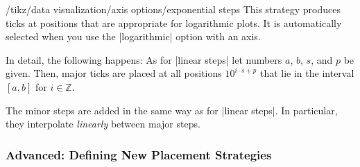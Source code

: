 \label{section-dv-exponential-strategy}

\begin{key}{/tikz/data visualization/axis options/exponential steps}
    This strategy produces ticks at positions that are appropriate for
    logarithmic plots. It is automatically selected when you use the
    |logarithmic| option with an axis.

    In detail, the following happens: As for |linear steps| let numbers $a$,
    $b$, $s$, and $p$ be given. Then, major ticks are placed at all positions
    $10^{i\cdot s+p}$ that lie in the interval $[a,b]$ for $i \in \mathbb{Z}$.

    The minor steps are added in the same way as for |linear steps|. In
    particular, they interpolate \emph{linearly} between major steps.
\begin{codeexample}[preamble={\usetikzlibrary{datavisualization}}]
\end{codeexample}
\end{key}


\subsubsection{Advanced: Defining New Placement Strategies}

